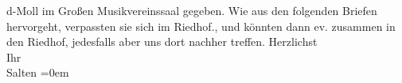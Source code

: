 \begin{ledgroupsized}[t]{13cm}
{{{{                     d-Moll} im Großen Musikvereinssaal
                  gegeben. Wie aus den folgenden Briefen hervorgeht, verpassten sie sich im Riedhof.}}}\label{K_L03402-2h}, und könnten dann ev. zusammen
               in den Riedhof, jedesfalls aber uns dort nachher
               treffen.\pend
           \pstart
           Herzlichst {\\[\baselineskip]}Ihr {\\[\baselineskip]}\spacefill\mbox{Salten}\pend
           \leftskip=0em{}
         
         \endnumbering{}\end{ledgroupsized}  \newcommand{\dateiname}{L03402}\newcommand{\titel}{Felix Salten an Arthur Schnitzler, [20. 12. 1904]}\newcommand{\editorInnen}{Martin Anton Müller und Laura Untner}
      